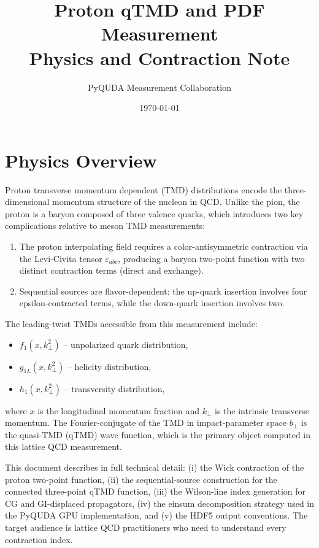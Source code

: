 \documentclass[11pt,a4paper]{article}
\title{Proton qTMD and PDF Measurement \\
       \large Physics and Contraction Note}
\author{PyQUDA Measurement Collaboration}
\date{\today}
\newcommand{\eps}{\varepsilon}
\begin{document}
\maketitle
\tableofcontents

\section{Physics Overview}

Proton transverse momentum dependent (TMD) distributions encode the three-dimensional
momentum structure of the nucleon in QCD. Unlike the pion, the proton is a baryon
composed of three valence quarks, which introduces two key complications relative to
meson TMD measurements:

\begin{enumerate}
  \item The proton interpolating field requires a color-antisymmetric contraction via
    the Levi-Civita tensor $\eps_{abc}$, producing a baryon two-point function with
    two distinct contraction terms (direct and exchange).
  \item Sequential sources are flavor-dependent: the up-quark insertion involves four
    epsilon-contracted terms, while the down-quark insertion involves two.
\end{enumerate}

The leading-twist TMDs accessible from this measurement include:
\begin{itemize}
  \item $f_1(x, k_\perp^2)$ -- unpolarized quark distribution,
  \item $g_{1L}(x, k_\perp^2)$ -- helicity distribution,
  \item $h_1(x, k_\perp^2)$ -- transversity distribution,
\end{itemize}
where $x$ is the longitudinal momentum fraction and $k_\perp$ is the intrinsic
transverse momentum. The Fourier-conjugate of the TMD in impact-parameter space
$b_\perp$ is the quasi-TMD (qTMD) wave function, which is the primary object
computed in this lattice QCD measurement.

This document describes in full technical detail: (i) the Wick contraction of the
proton two-point function, (ii) the sequential-source construction for the connected
three-point qTMD function, (iii) the Wilson-line index generation for CG and
GI-displaced propagators, (iv) the einsum decomposition strategy used in the PyQUDA
GPU implementation, and (v) the HDF5 output conventions. The target audience is
lattice QCD practitioners who need to understand every contraction index.
\end{document}
